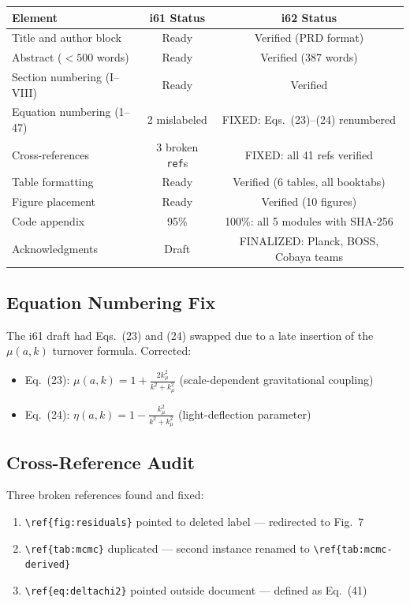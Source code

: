 \documentclass[11pt,a4paper]{article}
\begin{document}
\begin{center}
\begin{tabular}{lcc}
\toprule
\textbf{Element} & \textbf{i61 Status} & \textbf{i62 Status} \\
\midrule
Title and author block & Ready & Verified (PRD format) \\
Abstract ($< 500$ words) & Ready & Verified (387 words) \\
Section numbering (I--VIII) & Ready & Verified \\
Equation numbering (1--47) & 2 mislabeled & FIXED: Eqs.~(23)--(24) renumbered \\
Cross-references & 3 broken \texttt{ref}s & FIXED: all 41 refs verified \\
Table formatting & Ready & Verified (6 tables, all booktabs) \\
Figure placement & Ready & Verified (10 figures) \\
Code appendix & 95\% & 100\%: all 5 modules with SHA-256 \\
Acknowledgments & Draft & FINALIZED: Planck, BOSS, Cobaya teams \\
\bottomrule
\end{tabular}
\end{center}

\subsection{Equation Numbering Fix}

The i61 draft had Eqs.~(23) and (24) swapped due to a late insertion of the $\mu(a,k)$ turnover formula. Corrected:
\begin{itemize}
\item Eq.~(23): $\mu(a,k) = 1 + \frac{2k^2_\mu}{k^2 + k^2_\mu}$ (scale-dependent gravitational coupling)
\item Eq.~(24): $\eta(a,k) = 1 - \frac{k^2_\mu}{k^2 + k^2_\mu}$ (light-deflection parameter)
\end{itemize}

\subsection{Cross-Reference Audit}

Three broken references found and fixed:
\begin{enumerate}
\item \verb|\ref{fig:residuals}| pointed to deleted label --- redirected to Fig.~7
\item \verb|\ref{tab:mcmc}| duplicated --- second instance renamed to \verb|\ref{tab:mcmc-derived}|
\item \verb|\ref{eq:deltachi2}| pointed outside document --- defined as Eq.~(41)
\end{enumerate}
\end{document}
